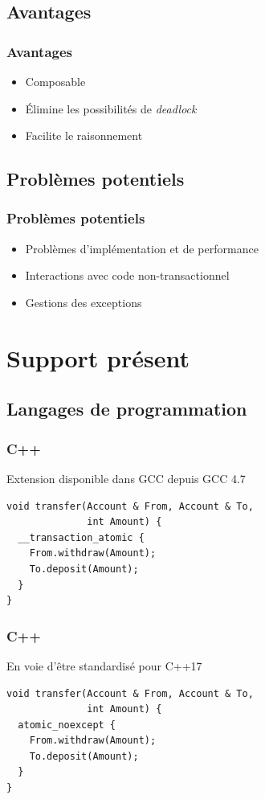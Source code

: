 \documentclass{beamer}
\begin{document}
\subsection{Avantages}
\begin{frame}
\frametitle{Avantages}
\begin{itemize}
\item Composable
\item Élimine les possibilités de \textit{deadlock}
\item Facilite le raisonnement
\end{itemize}
\end{frame}

\subsection{Problèmes potentiels}
\begin{frame}
\frametitle{Problèmes potentiels}
\begin{itemize}
\item Problèmes d'implémentation et de performance
\item Interactions avec code non-transactionnel
\item Gestions des exceptions
\end{itemize}
\end{frame}

\section{Support présent}
\subsection{Langages de programmation}
\begin{frame}[fragile]
\frametitle{C++}
Extension disponible dans GCC depuis GCC 4.7
\begin{lstlisting}
void transfer(Account & From, Account & To, 
              int Amount) {
  __transaction_atomic {
    From.withdraw(Amount);
    To.deposit(Amount);
  }
}
\end{lstlisting}
\end{frame}

\begin{frame}[fragile]
\frametitle{C++}
En voie d'être standardisé pour C++17
\begin{lstlisting}
void transfer(Account & From, Account & To, 
              int Amount) {
  atomic_noexcept {
    From.withdraw(Amount);
    To.deposit(Amount);
  }
}
\end{lstlisting}
\end{frame}
\end{document}
